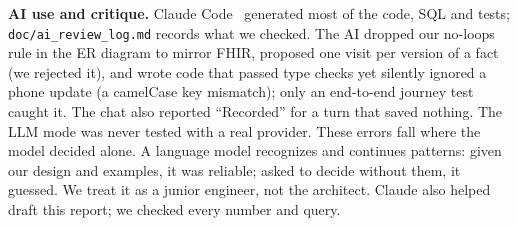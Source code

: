 \documentclass[sigconf]{acmart}
\begin{document}
\textbf{AI use and critique.} Claude Code~\cite{claudecode} generated most of the code, SQL and tests; \texttt{doc/ai\_review\_log.md} records what we checked. The AI dropped our no-loops rule in the ER diagram to mirror FHIR, proposed one visit per version of a fact (we rejected it), and wrote code that passed type checks yet silently ignored a phone update (a camelCase key mismatch); only an end-to-end journey test caught it. The chat also reported ``Recorded'' for a turn that saved nothing. The LLM mode was never tested with a real provider. These errors fall where the model decided alone. A language model recognizes and continues patterns: given our design and examples, it was reliable; asked to decide without them, it guessed. We treat it as a junior engineer, not the architect. Claude also helped draft this report; we checked every number and query.




\clearpage
\onecolumn
\end{document}
